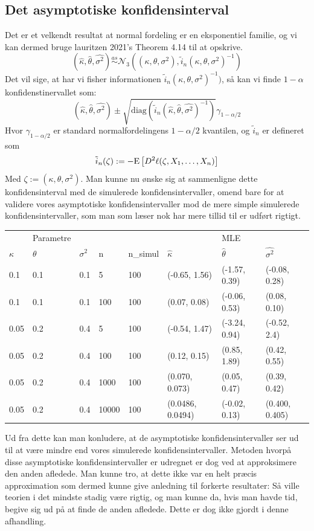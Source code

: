 \documentclass{article}
\theoremstyle{definition}
\theoremstyle{remark}
\begin{document}
\subsection{Det asymptotiske konfidensinterval}
Det er et velkendt resultat at normal fordeling er en eksponentiel familie, og vi kan dermed bruge lauritzen 2021's \color{red}Theorem 4.14\color{black} \cite{Lauritzen2021} til at opskrive.
$$(\hat\kappa,\hat\theta,\hat{\sigma^2})\overset{as}{\sim}\mathcal N_3((\kappa,\theta,\sigma^2),\tilde{i}_n (\kappa,\theta,\sigma^2)^{-1})$$
Det vil sige, at har vi fisher informationen $\tilde{i}_n (\kappa,\theta,\sigma^2)^{-1})$, så kan vi finde $1-\alpha$ konfidenstinervallet som:
$$(\hat\kappa,\hat\theta,\hat{\sigma^2})\pm \sqrt{\text{diag}(\tilde{i}_n (\hat\kappa,\hat\theta,\hat{\sigma^2})^{-1})}\gamma_{1-\alpha/2}$$
Hvor $\gamma_{1-\alpha/2}$ er standard normalfordelingens $1-\alpha/2$ kvantilen, og $\tilde i_n$ er defineret som
$$\tilde{i}_n (\zeta):= -\text E\left[D^2\ell (\zeta,X_1,\hdots,X_n)\right]$$
Med $\zeta := (\kappa,\theta,\sigma^2)$. Man kunne nu ønske sig at sammenligne dette konfidensinterval med de simulerede konfidensintervaller, omend bare for at validere vores asymptotiske konfidensintervaller mod de mere simple simulerede konfidensintervaller, som man som læser nok har mere tillid til er udført rigtigt.
\begin{center}
\begin{tabular}{llllllll}
 &Parametre&& &&& MLE  \\
 $\kappa$&$\theta$&$\sigma^2$&n&n\_simul&$\hat \kappa$&$\hat\theta$&$\hat{\sigma^2}$ \\
 0.1 & 0.1 & 0.1 & 5& 100 & (-0.65, 1.56)&(-1.57, 0.39)&(-0.08, 0.28)\\
 0.1 & 0.1 & 0.1 & 100& 100 & (0.07, 0.08)&(-0.06, 0.53)&(0.08, 0.10)\\
 0.05&0.2&0.4&5&100&(-0.54, 1.47)&(-3.24, 0.94)&(-0.52, 2.4)\\
 0.05&0.2&0.4&100&100&(0.12, 0.15)&(0.85, 1.89)&(0.42, 0.55)\\
 0.05&0.2&0.4&1000&100&(0.070, 0.073)&(0.05, 0.47)&(0.39, 0.42)\\
 0.05&0.2&0.4&10000&100&(0.0486, 0.0494)&(-0.02, 0.13)&(0.400, 0.405)
\end{tabular}
\end{center}
Ud fra dette kan man konludere, at de asymptotiske konfidensintervaller ser ud til at være mindre end vores simulerede konfidensintervaller. Metoden hvorpå disse asymptotiske konfidensintervaller er udregnet er dog ved at approksimere den anden afledede. Man kunne tro, at dette ikke var en helt præcis approximation som dermed kunne give anledning til forkerte resultater: Så ville teorien i det mindste stadig være rigtig, og man kunne da, hvis man havde tid, begive sig ud på at finde de anden afledede. Dette er dog ikke gjordt i denne afhandling.
\end{document}
